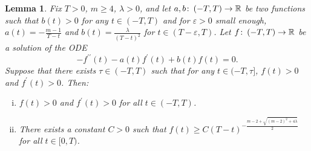 \documentclass{article}
\numberwithin{equation}{section}        %
\theoremstyle{bfnote}
\newtheorem{lem}[thm]{Lemma}                %
\theoremstyle{definition}
\theoremstyle{bfremark}
\newcommand{\col}{\colon \thinspace}        %
\newcommand{\R}{\mathbb{R}}                 %
\begin{document}
\begin{lem}     \label{lem: Preparatory ODE}
    Fix $T > 0$, $m \geq 4$, $\lambda > 0$, and let $a, b \col (-T,T) \to \R$ be two functions such that $b(t) > 0$ for any $t \in (-T,T)$ and for $\varepsilon > 0$ small enough, $a(t) = -\frac{m-1}{T-t}$ and $b(t) = \frac{\lambda}{(T-t)^2}$ for $t \in (T-\varepsilon,T)$. Let $f \col (-T,T) \rightarrow \R$ be a solution of the ODE
    \begin{equation*}
        -f^{\prime\prime}(t) - a(t) f^\prime(t) + b(t) f(t) = 0 .
    \end{equation*}
    Suppose that there exists $\tau \in (-T,T)$ such that for any $t \in (-T,\tau]$, $f(t) > 0$ and $f^\prime(t) > 0$. Then:
    \begin{enumerate}[(i)]
        \item $f(t) > 0$ and $f^\prime(t) > 0$ for all $t \in (-T,T)$.
        \item There exists a constant $C > 0$ such that $f(t) \geq C (T-t)^{-\frac{m-2 + \sqrt{(m-2)^2+4\lambda}}{2}}$ for all $t \in [0,T)$.
    \end{enumerate}
\end{lem}
\end{document}
